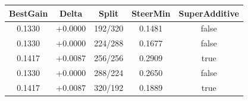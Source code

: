\begin{table}[h]
\centering
\begin{tabular}{ |c|c|c|c|c| }
\hline
BestGain & Delta & Split & SteerMin & SuperAdditive \\
\hline
0.1330 & +0.0000 & 192/320 & 0.1481 & false \\
\hline
0.1330 & +0.0000 & 224/288 & 0.1677 & false \\
\hline
0.1417 & +0.0087 & 256/256 & 0.2909 & true \\
\hline
0.1330 & +0.0000 & 288/224 & 0.2650 & false \\
\hline
0.1417 & +0.0087 & 320/192 & 0.1889 & true \\
\hline
\end{tabular}
\end{table}

